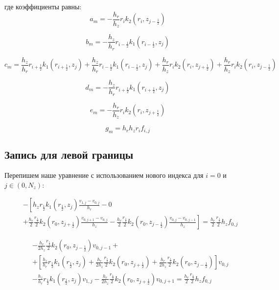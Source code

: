 где коэффициенты равны:
\[
  a_m = -\frac{h_r}{h_z} r_i k_2(r_i, z_{j - \frac{1}{2}})
\]

\[
  b_m = - \frac{h_z}{h_r} r_{i - \frac{1}{2}} k_1(r_{i - \frac{1}{2}}, z_j)
\]

\[
  c_m = \frac{h_z}{h_r} r_{i + \frac{1}{2}} k_1(r_{i + \frac{1}{2}}, z_j) + \frac{h_z}{h_r} r_{i - \frac{1}{2}} k_1(r_{i - \frac{1}{2}}, z_j) +
  \frac{h_r}{h_z} r_i k_2 (r_i, z_{j + \frac{1}{2}}) + \frac{h_r}{h_z} r_i k_2 (r_i, z_{j-\frac{1}{2}})
\]

\[
  d_m = - \frac{h_z}{h_r} r_{i + \frac{1}{2}} k_1(r_{i+ \frac{1}{2}}, z_j)
\]

\[
  e_m = - \frac{h_r}{h_z} r_i k_2(r_i, z_{j + \frac{1}{2}})
\]

\[
  g_m = h_r h_z r_i f_{i, j}
\]

\subsection{Запись для левой границы}

Перепишем наше уравнение с использованием нового индекса для $i = 0$ и $ j \in (0, N_z) $:

\begin{align*}
  &- \left [ 
    h_z r_{\frac{1}{2}} k_1(r_{\frac{1}{2}}, z_j) \frac{v_{1, j} - v_{0, j}}{h_{r}}
    - 0
    \right . \\
    &\left .
    + \frac{h_r}{2} \frac{r_{\frac{1}{2}}}{2} k_2(r_0, z_{j+\frac{1}{2}}) \frac{v_{0, j + 1} - v_{0, j}}{h_{z}}
    - \frac{h_r}{2} \frac{r_{\frac{1}{2}}}{2} k_2(r_0, z_{j-\frac{1}{2}}) \frac{v_{0, j} - v_{0, j - 1}}{h_z}
    \right ]  = \frac{h_r}{2} \frac{r_{\frac{1}{2}}}{2} h_z f_{0, j}
\end{align*}

\begin{align*}
  & - \frac{h_r}{2 h_z} \frac{r_{\frac{1}{2}}}{2} k_2(r_0, z_{j - \frac{1}{2}}) v_{0, j - 1} + \\
  & + \left[
    \frac{h_z}{h_r} r_{\frac{1}{2}} k_1(r_{\frac{1}{2}}, z_j) + \frac{h_r}{2 h_z} \frac{r_{\frac{1}{2}}}{2} k_2(r_0, z_{j+\frac{1}{2}})
    + \frac{h_r}{2 h_z} \frac{r_{\frac{1}{2}}}{2} k_2(r_0, z_{j -\frac{1}{2}})
  \right] v_{0, j} \\
  & - \frac{h_z}{h_r} r_{\frac{1}{2}} k_1(r_{\frac{1}{2}}, z_j) v_{1, j}
  - \frac{h_r}{2 h_z} \frac{r_{\frac{1}{2}}}{2} k_2(r_0, z_{j + \frac{1}{2}}) v_{0, j + 1} = \frac{h_r}{2} \frac{r_{\frac{1}{2}}}{2} h_z f_{0, j}
\end{align*}

